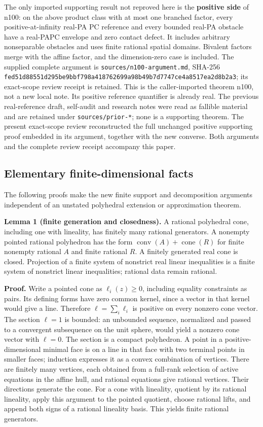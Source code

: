 \documentclass[
  11pt,
]{article}
\begin{document}
The only imported supporting result not reproved here is the
\textbf{positive side} of n100: on the above product class with at most
one branched factor, every positive-at-infinity real-PA PC reference and
every bounded real-PA obstacle have a real-PAPC envelope and zero
contact defect. It includes arbitrary nonseparable obstacles and uses
finite rational spatial domains. Bivalent factors merge with the affine
factor, and the dimension-zero case is included. The supplied complete
argument is \texttt{sources/n100-argument.md}, SHA-256
\texttt{fed51d88551d295be9bbf798a418762699a98b49b7d7747ce4a8517ea2d8b2a3};
its exact-scope review receipt is retained. This is the caller-imported
theorem n100, not a new local note. Its positive reference quantifier is
already real. The previous real-reference draft, self-audit and research
notes were read as fallible material and are retained under
\texttt{sources/prior-*}; none is a supporting theorem. The present
exact-scope review reconstructed the full unchanged positive supporting
proof embedded in its argument, together with the new converse. Both
arguments and the complete review receipt accompany this paper.

\subsection{Elementary finite-dimensional
facts}\label{elementary-finite-dimensional-facts}

The following proofs make the new finite support and decomposition
arguments independent of an unstated polyhedral extension or
approximation theorem.

\textbf{Lemma 1 (finite generation and closedness).} A rational
polyhedral cone, including one with lineality, has finitely many
rational generators. A nonempty pointed rational polyhedron has the form
\(\operatorname{conv}(A)+\operatorname{cone}(R)\) for finite nonempty
rational \(A\) and finite rational \(R\). A finitely generated real cone
is closed. Projection of a finite system of nonstrict real linear
inequalities is a finite system of nonstrict linear inequalities;
rational data remain rational.

\textbf{Proof.} Write a pointed cone as \(\ell_i(z)\geq0\), including
equality constraints as pairs. Its defining forms have zero common
kernel, since a vector in that kernel would give a line. Therefore
\(\ell=\sum_i\ell_i\) is positive on every nonzero cone vector. The
section \(\ell=1\) is bounded: an unbounded sequence, normalized and
passed to a convergent subsequence on the unit sphere, would yield a
nonzero cone vector with \(\ell=0\). The section is a compact
polyhedron. A point in a positive-dimensional minimal face is on a line
in that face with two terminal points in smaller faces; induction
expresses it as a convex combination of vertices. There are finitely
many vertices, each obtained from a full-rank selection of active
equations in the affine hull, and rational equations give rational
vertices. Their directions generate the cone. For a cone with lineality,
quotient by its rational lineality, apply this argument to the pointed
quotient, choose rational lifts, and append both signs of a rational
lineality basis. This yields finite rational generators.
\end{document}
